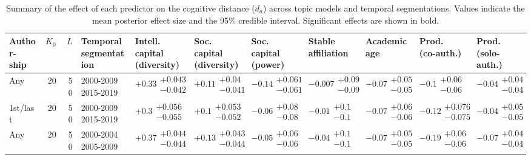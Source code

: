\begin{table}[H]
\caption{Summary of the effect of each predictor on the cognitive distance ($d_a$) across topic models and temporal segmentations. Values indicate the mean posterior effect size and the 95\% credible interval. Significant effects are shown in bold.}
\label{table:full_summary_disruption}
\renewcommand{\arraystretch}{2}\fontsize{6}{7}\selectfont\begin{tabular}{lrrllllllll}
\toprule
\makecell{Author-\\ ship} & $K_0$ & $L$ & \makecell{Temporal \\ segmentation} & \makecell{Intell. capital \\ (diversity)} & \makecell{Soc. capital \\ (diversity)} & \makecell{Soc. capital \\ (power)} & \makecell{Stable \\ affiliation} & \makecell{Academic \\ age} & \makecell{Prod. \\ (co-auth.)} & \makecell{Prod. \\ (solo-auth.)} \\
\midrule
Any & 20 & 50 & \makecell{2000-2009 \\ 2015-2019} & $\bm{+0.33}\substack{+0.043 \\ -0.042}$ & $\bm{+0.11}\substack{+0.04 \\ -0.041}$ & $\bm{-0.14}\substack{+0.061 \\ -0.061}$ & $-0.007\substack{+0.09 \\ -0.09}$ & $\bm{-0.07}\substack{+0.05 \\ -0.05}$ & $\bm{-0.1}\substack{+0.06 \\ -0.06}$ & $-0.04\substack{+0.04 \\ -0.04}$ \\
1st/last & 20 & 50 & \makecell{2000-2009 \\ 2015-2019} & $\bm{+0.3}\substack{+0.056 \\ -0.055}$ & $\bm{+0.1}\substack{+0.053 \\ -0.052}$ & $-0.06\substack{+0.08 \\ -0.08}$ & $-0.01\substack{+0.1 \\ -0.1}$ & $\bm{-0.07}\substack{+0.06 \\ -0.06}$ & $\bm{-0.12}\substack{+0.076 \\ -0.075}$ & $-0.04\substack{+0.05 \\ -0.05}$ \\
Any & 20 & 50 & \makecell{2000-2004 \\ 2005-2009} & $\bm{+0.37}\substack{+0.044 \\ -0.044}$ & $\bm{+0.13}\substack{+0.043 \\ -0.044}$ & $-0.05\substack{+0.06 \\ -0.06}$ & $-0.04\substack{+0.1 \\ -0.1}$ & $\bm{-0.07}\substack{+0.05 \\ -0.05}$ & $\bm{-0.19}\substack{+0.06 \\ -0.06}$ & $\bm{-0.07}\substack{+0.04 \\ -0.04}$ \\

\end{tabular}
\end{table}
